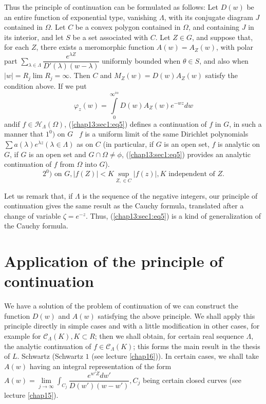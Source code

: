 Thus the principle of continuation can be formulated as follows: Let $D
(w)$ be an entire function of exponential type, vanishing $\Lambda$,
with its conjugate diagram $J$ contained in $\Omega$. Let $C$ be a
convex polygon contained in $\Omega$, and containing $J$ in its
interior, and let $S$ be a set associated with $C$. Let $Z \in
G$, and suppose that, for each $Z$, there exists a meromorphic
function $A (w) = A_Z (w)$, with polar part $\sum\limits_{ \lambda
 \in \Lambda} \dfrac{e^{\lambda Z}} {D' (\lambda) (w-
 \lambda)}$ uniformly bounded when $\theta \in S$, and also
when $|w| = R_j \lim R_j = \infty$. Then $C$ and $M_Z(w) = D (w) A_Z
(w)$ satisfy the condition above. If we put 
\begin{equation}
 \varphi_ z(w) = \int\limits^{\infty{^{ i \alpha}}}_0 D (w) A_Z (w)
 e^{- wz} dw \tag{6}\label{chap13:sec1:eq6} 
\end{equation}
and\pageoriginale if $f \in \mathscr{H}_\Lambda (\Omega)$,
(\ref{chap13:sec1:eq5}) defines a
continuation of $f$ in $G$, in such a manner that $1^0)$ on $G$~ $f$
is a uniform limit of the same Dirichlet polynomials $\sum a
(\lambda) e^{\lambda z} (\lambda \in \Lambda)$ as on $C$ (in
particular, if $G$ is an open set, $f$ is analytic on $G$, if $G$ is
an open set and $G \cap \Omega \neq \phi$, (\ref{chap13:sec1:eq5}) provides an analytic
continuation of $f$ from $\Omega$ into $G$). 
\begin{equation*}
  2^0) \text{ on } G, |f (Z) |<
  K \sup\limits_{Z, \in C} |f (z)|, K \text{ independent of }
  Z. \tag{7}\label{chap13:sec1:eq7}  
\end{equation*}

Let us remark that, if $\Lambda$ is the sequence of the negative
integers, our principle of continuation gives the same result as the
Cauchy formula, translated after a change of variable $\zeta =
e^{-z}$. Thus, (\ref{chap13:sec1:eq5}) is a kind of generalization of the Cauchy
formula. 

\section{Application of the principle of continuation}\label{chap13:sec2}%

We have a solution of the problem of continuation of we can construct
the function $D (w)$ and $A (w)$ satisfying the above principle. We
shall apply this principle directly in simple cases and with a little
modification in other cases, for example for $\mathscr{C}_\Lambda (K),
K \subset R$; then we shall obtain, for certain real sequence
$\Lambda$, the analytic continuation of $f \in
\mathscr{C}_\Lambda (K)$; this forms the main result in the thesis of
$L$. Schwartz (Schwartz $1$ (see lecture \ref{chap16})). In certain cases, we
shall take $A (w)$ having an integral representation of the form $A(w)=
\lim\limits_{ j \to \infty} \int_{C_j} \dfrac{e^{w'Z} dw'}{D (w')
 (w-w')}, C_j$ being certain closed curves (see lecture \ref{chap15}). 

